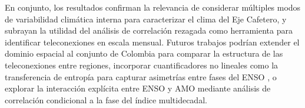 \documentclass[12pt, a4paper]{article}
\begin{document}
En conjunto, los resultados confirman la relevancia de considerar múltiples
modos de variabilidad climática interna para caracterizar el clima del Eje
Cafetero, y subrayan la utilidad del análisis de correlación rezagada como
herramienta para identificar teleconexiones en escala mensual. Futuros trabajos
podrían extender el dominio espacial al conjunto de Colombia para comparar
la estructura de las teleconexiones entre regiones, incorporar cuantificadores
no lineales como la transferencia de entropía para capturar asimetrías entre
fases del ENSO \citep{Poveda2011,
	CórdobaMachado2015a}, o explorar la interacción explícita entre
ENSO y AMO mediante análisis de correlación condicional a la fase del índice
multidecadal.


\end{document}
